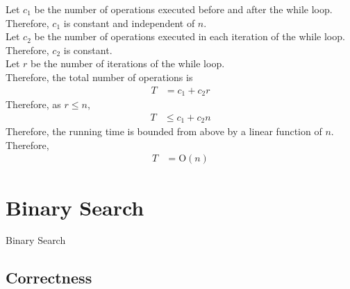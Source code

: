 \documentclass[titlepage, fleqn, a4paper, 12pt, twoside]{article}
\theoremstyle{definition}
\theoremstyle{theorem}
\let\And\relax
\begin{document}
Let $c_1$ be the number of operations executed before and after the while loop.
Therefore, $c_1$ is constant and independent of $n$.\\
Let $c_2$ be the number of operations executed in each iteration of the while loop.
Therefore, $c_2$ is constant.\\
Let $r$ be the number of iterations of the while loop.\\
Therefore, the total number of operations is
\begin{align*}
	T & = c_1 + c_2 r
\end{align*}
Therefore, as $r \le n$,
\begin{align*}
	T & \le c_1 + c_2 n
\end{align*}
Therefore, the running time is bounded from above by a linear function of $n$.
Therefore,
\begin{align*}
	T & = \mathrm{O}(n)
\end{align*}

\section{Binary Search}

\begin{algorithm}[H]
	\begin{algorithmic}[1]
		\Statex
		\While{$\texttt{found} = \False \And \texttt{min} \le \texttt{max} $}
			\Else
			\EndIf
		\EndWhile
		\Else
		\EndIf
		\EndFunction
	\end{algorithmic}
	\caption{Binary Search}
	\label{alg:Binary_Search}
\end{algorithm}

\subsection{Correctness}
\end{document}
